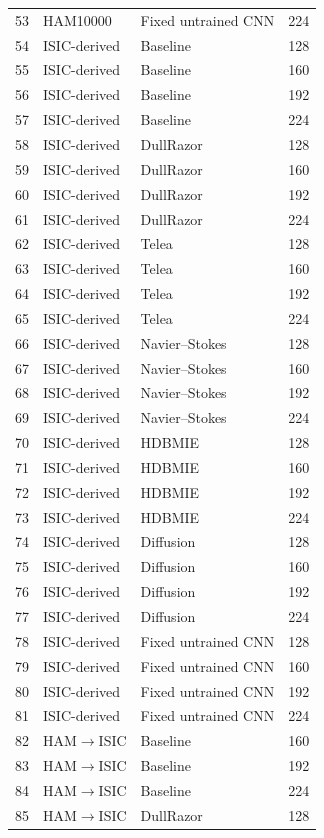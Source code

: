 \begin{longtable}{p{1cm}p{4.2cm}p{4.8cm}p{2cm}}
53 & HAM10000 & Fixed untrained CNN & 224 \\
54 & ISIC-derived & Baseline & 128 \\
55 & ISIC-derived & Baseline & 160 \\
56 & ISIC-derived & Baseline & 192 \\
57 & ISIC-derived & Baseline & 224 \\
58 & ISIC-derived & DullRazor & 128 \\
59 & ISIC-derived & DullRazor & 160 \\
60 & ISIC-derived & DullRazor & 192 \\
61 & ISIC-derived & DullRazor & 224 \\
62 & ISIC-derived & Telea & 128 \\
63 & ISIC-derived & Telea & 160 \\
64 & ISIC-derived & Telea & 192 \\
65 & ISIC-derived & Telea & 224 \\
66 & ISIC-derived & Navier--Stokes & 128 \\
67 & ISIC-derived & Navier--Stokes & 160 \\
68 & ISIC-derived & Navier--Stokes & 192 \\
69 & ISIC-derived & Navier--Stokes & 224 \\
70 & ISIC-derived & HDBMIE & 128 \\
71 & ISIC-derived & HDBMIE & 160 \\
72 & ISIC-derived & HDBMIE & 192 \\
73 & ISIC-derived & HDBMIE & 224 \\
74 & ISIC-derived & Diffusion & 128 \\
75 & ISIC-derived & Diffusion & 160 \\
76 & ISIC-derived & Diffusion & 192 \\
77 & ISIC-derived & Diffusion & 224 \\
78 & ISIC-derived & Fixed untrained CNN & 128 \\
79 & ISIC-derived & Fixed untrained CNN & 160 \\
80 & ISIC-derived & Fixed untrained CNN & 192 \\
81 & ISIC-derived & Fixed untrained CNN & 224 \\
82 & HAM$\rightarrow$ISIC & Baseline & 160 \\
83 & HAM$\rightarrow$ISIC & Baseline & 192 \\
84 & HAM$\rightarrow$ISIC & Baseline & 224 \\
85 & HAM$\rightarrow$ISIC & DullRazor & 128 \\

\end{longtable}
